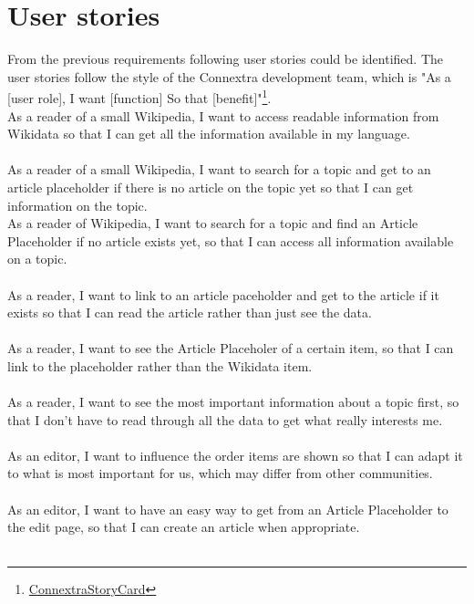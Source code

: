 \section{User stories}

From the previous requirements following user stories could be identified. The user stories follow the style of the Connextra development team, which is "As a [user role], I want [function] So that [benefit]"\footnote{\href{http://agilecoach.typepad.com/photos/connextra_user_story_2001/connextrastorycard.html}{ConnextraStoryCard}}. \\

As a reader of a small Wikipedia, I want to access readable information from Wikidata so that I can get all the information available in my language. \\
\\
As a reader of a small Wikipedia, I want to search for a topic and get to an article placeholder if there is no article on the topic yet so that I can get information on the topic. \\ As a reader of Wikipedia, I want to search for a topic and find an Article Placeholder if no article exists yet, so that I can access all information available on a topic. \\
\\
As a reader, I want to link to an article paceholder and get to the article if it exists so that I can read the article rather than just see the data. \\
\\
As a reader, I want to see the Article Placeholer of a certain item, so that I can link to the placeholder rather than the Wikidata item. \\
\\
As a reader, I want to see the most important information about a topic first, so that I don't have to read through all the data to get what really interests me. \\
\\
As an editor, I want to influence the order items are shown so that I can adapt it to what is most important for us, which may differ from other communities.\\
\\
As an editor, I want to have an easy way to get from an Article Placeholder to the edit page, so that I can create an article when appropriate. \\
\\
